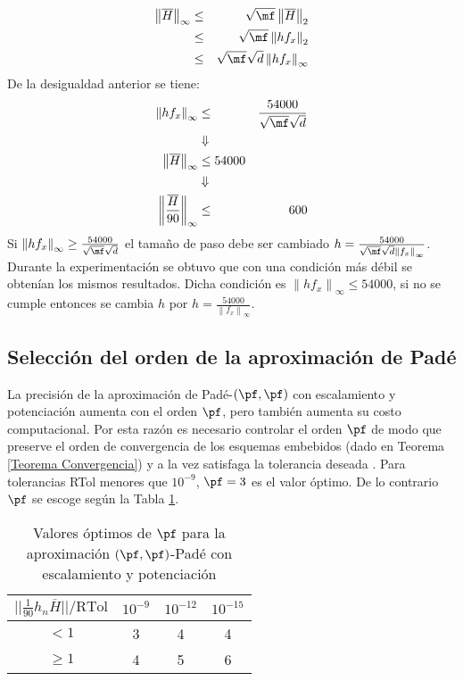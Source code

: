 \begin{eqnarray*}
	\left\lVert \overline{H} \right\rVert_\infty & \leq & \sqrt{\mf}\left\lVert \overline{H}\right\rVert_2 \\
	& \leq & \sqrt{\mf}\left\lVert hf_x \right\rVert_2 \\
	& \leq & \sqrt{\mf} \sqrt{d} \left\lVert hf_x \right\rVert_\infty \\    
\end{eqnarray*}
De la desigualdad anterior se tiene:
\begin{eqnarray*}
	\left\lVert hf_x \right\rVert_\infty & \leq & \frac{54000}{\sqrt{\mf} \sqrt{d}} \\
	& \Downarrow & \\
	\left\lVert \overline{H} \right\rVert_\infty & \leq 54000\\
	& \Downarrow & \\
	\left\lVert \frac{\overline{H}}{90} \right\rVert_\infty & \leq & 600    
\end{eqnarray*}
Si $\left\lVert hf_x \right\rVert_\infty  \geq  \frac{54000}{\sqrt{\mf} \sqrt{d}}$ el tama\~no de paso debe ser cambiado
$h=\frac{54000}{\sqrt{\mf} \sqrt{d}\left\lVert f_x \right\rVert_\infty}$. Durante la experimentaci\'on se obtuvo que con
una condici\'on m\'as débil se obten\'ian los mismos resultados. Dicha condici\'on es 
$\left\lVert hf_x \right\rVert_\infty \leq 54000$, si no se cumple entonces se cambia $h$ por 
$h=\frac{54000}{\left\lVert f_x \right\rVert_\infty}$.

\subsection{Selecci\'on del orden de la aproximaci\'on de Pad\'e} \label{pade-order}
 La precisión de la aproximación de Padé-$(\pf,\pf)$ con  escalamiento y potenciaci\'on aumenta con el orden $\pf$, pero también aumenta su costo computacional. Por esta razón es necesario controlar el orden $\pf$ de modo que preserve el orden de convergencia de los esquemas embebidos (dado en Teorema \ref{Teorema Convergencia}) y a la vez satisfaga la tolerancia deseada \cite{Jimenez14AMC}.
 Para tolerancias RTol menores que $10^{-9}$,  $\pf = 3$ es el valor óptimo. De lo contrario $\pf$ se escoge según la Tabla \ref{tab:padep}.
\begin{table}[H]
	\begin{center}
		\begin{tabular}{c|ccc} 
			$\lvert\lvert \frac{1}{90}h_n\overline{H} \rvert\rvert/\mathrm{RTol}$ & $10^{-9}$ & $10^{-12}$ & $10^{-15}$ \\ 
			\hline 
			$<1$ & 3 & 4 & 4 \\ 
			$\geq 1$ & 4 & 5 & 6 \\  
		\end{tabular} 
		\caption{Valores \'optimos de $\pf$ para la aproximaci\'on $(\pf,\pf)$-Pad\'e con escalamiento y potenciaci\'on}
		\label{tab:padep}
	\end{center}
\end{table}


